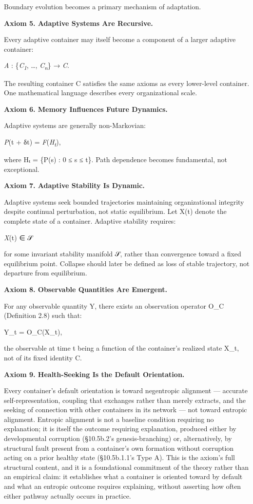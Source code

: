 \documentclass[
]{article}
\begin{document}
Boundary evolution becomes a primary mechanism of adaptation.

\textbf{Axiom 5. Adaptive Systems Are Recursive.}

Every adaptive container may itself become a component of a larger
adaptive container:

\emph{A} : \{\emph{C\textsubscript{1}}, \ldots,
\emph{C\textsubscript{n}}\} → \emph{C}.

The resulting container C satisfies the same axioms as every lower-level
container. One mathematical language describes every organizational
scale.

\textbf{Axiom 6. Memory Influences Future Dynamics.}

Adaptive systems are generally non-Markovian:

\emph{P}(t + δt) = \emph{F}(\emph{H\textsubscript{t}}),

where Hₜ = \{P(s) : 0 ≤ s ≤ t\}. Path dependence becomes fundamental,
not exceptional.

\textbf{Axiom 7. Adaptive Stability Is Dynamic.}

Adaptive systems seek bounded trajectories maintaining organizational
integrity despite continual perturbation, not static equilibrium. Let
X(t) denote the complete state of a container. Adaptive stability
requires:

\emph{X}(t) ∈ 𝒮

for some invariant stability manifold 𝒮, rather than convergence toward
a fixed equilibrium point. Collapse should later be defined as loss of
stable trajectory, not departure from equilibrium.

\textbf{Axiom 8. Observable Quantities Are Emergent.}

For any observable quantity Y, there exists an observation operator O\_C
(Definition 2.8) such that:

Y\_t = O\_C(X\_t),

the observable at time t being a function of the container's realized
state X\_t, not of its fixed identity C.

\textbf{Axiom 9. Health-Seeking Is the Default Orientation.}

Every container's default orientation is toward negentropic alignment
--- accurate self-representation, coupling that exchanges rather than
merely extracts, and the seeking of connection with other containers in
its network --- not toward entropic alignment. Entropic alignment is not
a baseline condition requiring no explanation; it is itself the outcome
requiring explanation, produced either by developmental corruption
(§10.5b.2's genesis-branching) or, alternatively, by structural fault
present from a container's own formation without corruption acting on a
prior healthy state (§10.5b.1.1's Type A). This is the axiom's full
structural content, and it is a foundational commitment of the theory
rather than an empirical claim: it establishes what a container is
oriented toward by default and what an entropic outcome requires
explaining, without asserting how often either pathway actually occurs
in practice.
\end{document}
